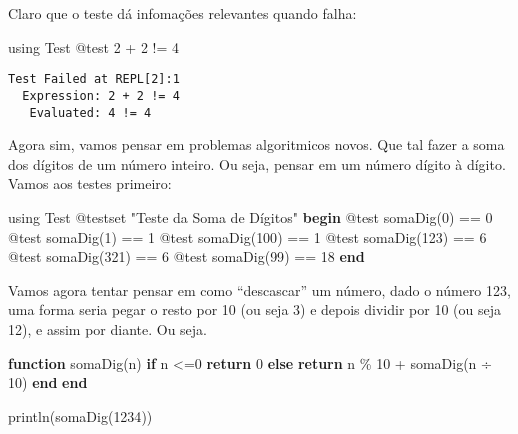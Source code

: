\documentclass[
  letterpaper,
  DIV=11,
  numbers=noendperiod]{scrreprt}
\newenvironment{Shaded}{\begin{snugshade}}{\end{snugshade}}
\newcommand{\BuiltInTok}[1]{\textcolor[rgb]{0.00,0.23,0.31}{#1}}
\newcommand{\ControlFlowTok}[1]{\textcolor[rgb]{0.00,0.23,0.31}{\textbf{#1}}}
\newcommand{\FloatTok}[1]{\textcolor[rgb]{0.68,0.00,0.00}{#1}}
\newcommand{\FunctionTok}[1]{\textcolor[rgb]{0.28,0.35,0.67}{#1}}
\newcommand{\ImportTok}[1]{\textcolor[rgb]{0.00,0.46,0.62}{#1}}
\newcommand{\KeywordTok}[1]{\textcolor[rgb]{0.00,0.23,0.31}{\textbf{#1}}}
\newcommand{\NormalTok}[1]{\textcolor[rgb]{0.00,0.23,0.31}{#1}}
\newcommand{\OperatorTok}[1]{\textcolor[rgb]{0.37,0.37,0.37}{#1}}
\newcommand{\PreprocessorTok}[1]{\textcolor[rgb]{0.68,0.00,0.00}{#1}}
\newcommand{\StringTok}[1]{\textcolor[rgb]{0.13,0.47,0.30}{#1}}
\begin{document}
Claro que o teste dá infomações relevantes quando falha:

\begin{Shaded}
\begin{Highlighting}[]
\ImportTok{using} \BuiltInTok{Test}
\PreprocessorTok{@test} \FloatTok{2} \OperatorTok{+} \FloatTok{2} \OperatorTok{!=} \FloatTok{4}
\end{Highlighting}
\end{Shaded}

\begin{verbatim}
Test Failed at REPL[2]:1
  Expression: 2 + 2 != 4
   Evaluated: 4 != 4
\end{verbatim}

Agora sim, vamos pensar em problemas algoritmicos novos. Que tal fazer a
soma dos dígitos de um número inteiro. Ou seja, pensar em um número
dígito à dígito. Vamos aos testes primeiro:

\begin{Shaded}
\begin{Highlighting}[]
\ImportTok{using} \BuiltInTok{Test}
\PreprocessorTok{@testset} \StringTok{"Teste da Soma de Dígitos"} \ControlFlowTok{begin}
    \PreprocessorTok{@test} \FunctionTok{somaDig}\NormalTok{(}\FloatTok{0}\NormalTok{) }\OperatorTok{==} \FloatTok{0}
    \PreprocessorTok{@test} \FunctionTok{somaDig}\NormalTok{(}\FloatTok{1}\NormalTok{) }\OperatorTok{==} \FloatTok{1}
    \PreprocessorTok{@test} \FunctionTok{somaDig}\NormalTok{(}\FloatTok{100}\NormalTok{) }\OperatorTok{==} \FloatTok{1}
    \PreprocessorTok{@test} \FunctionTok{somaDig}\NormalTok{(}\FloatTok{123}\NormalTok{) }\OperatorTok{==} \FloatTok{6}
    \PreprocessorTok{@test} \FunctionTok{somaDig}\NormalTok{(}\FloatTok{321}\NormalTok{) }\OperatorTok{==} \FloatTok{6}
    \PreprocessorTok{@test} \FunctionTok{somaDig}\NormalTok{(}\FloatTok{99}\NormalTok{) }\OperatorTok{==} \FloatTok{18}
\ControlFlowTok{end}
\end{Highlighting}
\end{Shaded}

Vamos agora tentar pensar em como ``descascar'' um número, dado o número
123, uma forma seria pegar o resto por 10 (ou seja 3) e depois dividir
por 10 (ou seja 12), e assim por diante. Ou seja.

\begin{Shaded}
\begin{Highlighting}[]
\KeywordTok{function} \FunctionTok{somaDig}\NormalTok{(n)}
    \ControlFlowTok{if}\NormalTok{ n }\OperatorTok{\textless{}=}\FloatTok{0} \ControlFlowTok{return} \FloatTok{0}
    \ControlFlowTok{else}
        \ControlFlowTok{return}\NormalTok{ n }\OperatorTok{\%} \FloatTok{10} \OperatorTok{+} \FunctionTok{somaDig}\NormalTok{(n }\OperatorTok{÷} \FloatTok{10}\NormalTok{)}
    \ControlFlowTok{end}
\KeywordTok{end}

\FunctionTok{println}\NormalTok{(}\FunctionTok{somaDig}\NormalTok{(}\FloatTok{1234}\NormalTok{))}
\end{Highlighting}
\end{Shaded}
\end{document}
